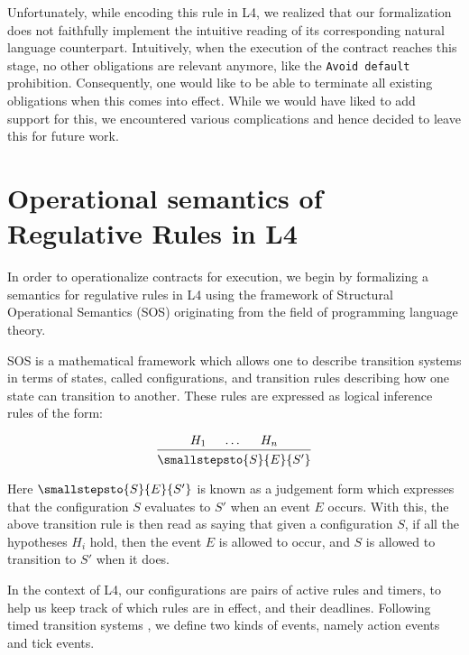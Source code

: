 \documentclass{article}
\begin{document}
Unfortunately, while encoding this rule in L4, we realized that our
formalization does not faithfully implement the intuitive reading of its
corresponding natural language counterpart.
Intuitively, when the execution of the contract reaches this stage, no other
obligations are relevant anymore, like the \texttt{Avoid default} prohibition.
Consequently, one would like to be able to terminate
all existing obligations when this comes into effect.
While we would have liked to add support for this, we encountered various
complications and hence decided to leave this for future work.

\section{Operational semantics of Regulative Rules in L4}

In order to operationalize contracts for execution, we begin by formalizing a
semantics for regulative rules in L4 using the framework of Structural
Operational Semantics (SOS) 
originating from the field of programming language theory.

SOS is a mathematical framework which allows one to describe
transition systems in terms of states, called configurations, and transition
rules describing how one state can transition to another.
These rules are expressed as logical inference rules of the form:

\begin{align*}
  \begin{prooftree}
    \hypo{H_1}
    \hypo{\dots}
    \hypo{H_n}
    \infer3{\smallstepsto{S}{E}{S'}}
  \end{prooftree}
\end{align*}

Here $\smallstepsto{S}{E}{S'}$ is known as a judgement form which expresses that
the configuration $S$ evaluates to $S'$ when an event $E$ occurs.
With this, the above transition rule is then read as saying that given a
configuration $S$, if all the hypotheses $H_i$ hold, then the event $E$ is
allowed to occur, and $S$ is allowed to transition to $S'$ when it does.

In the context of L4, our configurations are pairs of active rules and timers,
to help us keep track of which rules are in effect, and their deadlines.
Following timed transition systems , we define two kinds of events,
namely action events and tick events.
\end{document}
